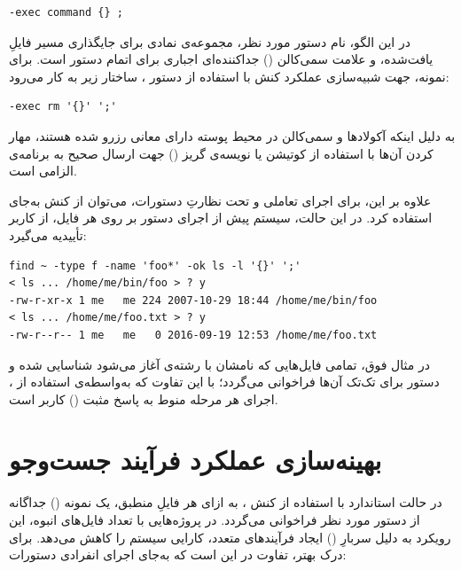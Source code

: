 \begin{latin}
\begin{lstlisting}
-exec command {} ;
\end{lstlisting}
\end{latin}

در این الگو،  نام دستور مورد نظر، مجموعه‌ی \cmd{\{\}} نمادی برای جایگذاری مسیر فایلِ یافت‌شده، و علامت سمی‌کالن (\cmd{;}) جداکننده‌ای اجباری برای اتمام دستور است. برای نمونه، جهت شبیه‌سازی عملکرد کنش  با استفاده از دستور ، ساختار زیر به کار می‌رود:

\begin{latin}
\begin{lstlisting}
-exec rm '{}' ';'
\end{lstlisting}
\end{latin}

به دلیل اینکه آکولادها و سمی‌کالن در محیط پوسته دارای معانی رزرو شده هستند، مهار کردن آن‌ها با استفاده از کوتیشن یا نویسه‌ی گریز (\cmd{\textbackslash}) جهت ارسال صحیح به برنامه‌ی  الزامی است.

علاوه بر این، برای اجرای تعاملی و تحت نظارتِ دستورات، می‌توان از کنش  به‌جای  استفاده کرد. در این حالت، سیستم پیش از اجرای دستور بر روی هر فایل، از کاربر تأییدیه می‌گیرد:

\begin{latin}
\begin{lstlisting}
find ~ -type f -name 'foo*' -ok ls -l '{}' ';'
< ls ... /home/me/bin/foo > ? y
-rw-r-xr-x 1 me   me 224 2007-10-29 18:44 /home/me/bin/foo
< ls ... /home/me/foo.txt > ? y
-rw-r--r-- 1 me   me   0 2016-09-19 12:53 /home/me/foo.txt
\end{lstlisting}
\end{latin}

در مثال فوق، تمامی فایل‌هایی که نامشان با رشته‌ی  آغاز می‌شود شناسایی شده و دستور  برای تک‌تک آن‌ها فراخوانی می‌گردد؛ با این تفاوت که به‌واسطه‌ی استفاده از ، اجرای هر مرحله منوط به پاسخ مثبت () کاربر است.

\section{بهینه‌سازی عملکرد فرآیند جست‌وجو}

در حالت استاندارد با استفاده از کنش ، به ازای هر فایلِ منطبق، یک نمونه () جداگانه از دستور مورد نظر فراخوانی می‌گردد. در پروژه‌هایی با تعداد فایل‌های انبوه، این رویکرد به دلیل سربارِ () ایجاد فرآیندهای متعدد، کارایی سیستم را کاهش می‌دهد. برای درک بهتر، تفاوت در این است که به‌جای اجرای انفرادی دستورات:

